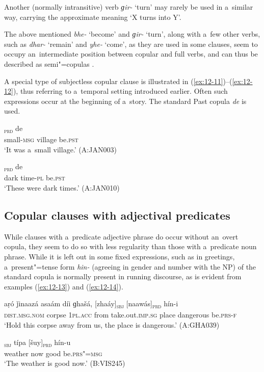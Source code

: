 Another (normally intransitive) verb \textit{ɡir-} `turn' may rarely be used in a~similar way, carrying the approximate meaning `X turns into Y'.



The above mentioned \textit{bhe-} `become' and \textit{ɡir-} `turn', along with a~few other verbs, such as \textit{dhar-} `remain' and \textit{yhe-} `come', as they are used in some clauses, seem to occupy an~intermediate position between copular and full verbs, and can thus be described as semi"=copulas \citep[5--6]{pustet2003}. 



A special type of subjectless copular clause is illustrated in (\ref{ex:12-11})--(\ref{ex:12-12}), thus referring to a~temporal setting introduced earlier. Often such expressions occur at the beginning of a~story. The standard Past copula \textit{de} is used.

\begin{exe}
\ex
\label{ex:12-11}
\textsubscript{\textsc{prd}} de \\
small-\textsc{msg} village be.\textsc{pst} \\
\glt `It was a~small village.' (A:JAN003)
\end{exe}
\begin{exe}
\ex
\label{ex:12-12}
\textsubscript{\textsc{prd}} de \\
dark time-\textsc{pl} be.\textsc{pst} \\
\glt `These were dark times.' (A:JAN010)
\end{exe}

\subsection{Copular clauses with adjectival predicates}
\label{subsec:12-1-2}


While clauses with a~predicate adjective phrase do occur without an~overt copula, they seem to do so with less regularity than those with a~predicate noun phrase. While it is left out in some fixed expressions, such as in greetings, a~present"=tense form \textit{hin-} (agreeing in gender and number with the NP) of the standard copula is normally present in running discourse, as is evident from examples (\ref{ex:12-13}) and (\ref{ex:12-14}). 

\begin{exe}
\ex
\label{ex:12-13}
\gll aṛó ǰinaazá asaám díi ɡhašá, [zhaáy]\textsubscript{\textsc{sbj}} [naawás]\textsubscript{\textsc{prd}} hín-i \\
\textsc{dist.msg.nom} corpse \textsc{1pl.acc} from take.out.\textsc{imp.sg}  place dangerous be.\textsc{prs-f} \\
\glt `Hold this corpse away from us, the place is dangerous.' (A:GHA039)
\end{exe}
\begin{exe}
\ex
\label{ex:12-14}
\gll [moosúm]\textsubscript{\textsc{sbj}} típa [šuy]\textsubscript{\textsc{prd}} hín-u \\
weather now good be.\textsc{prs"=msg} \\
\glt `The weather is good now.' (B:VIS245)
\end{exe}

